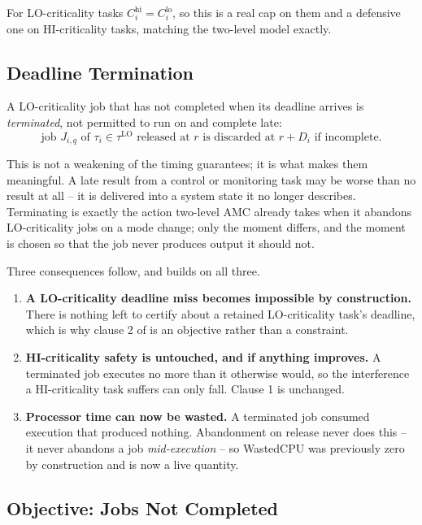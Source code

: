 For LO-criticality tasks $C_i^{\mathrm{hi}} = C_i^{\mathrm{lo}}$, so this is a
real cap on them and a defensive one on HI-criticality tasks, matching the
two-level model exactly.

\subsection{Deadline Termination}
\label{sec:termination}

A LO-criticality job that has not completed when its deadline arrives is
\emph{terminated}, not permitted to run on and complete late:
\[
\text{job } J_{i,q} \text{ of } \tau_i \in \tau^{\mathrm{LO}}
\text{ released at } r \text{ is discarded at } r + D_i \text{ if incomplete.}
\]

This is not a weakening of the timing guarantees; it is what makes them
meaningful. A late result from a control or monitoring task may be worse than
no result at all -- it is delivered into a system state it no longer describes.
Terminating is exactly the action two-level AMC already takes when it abandons
LO-criticality jobs on a mode change; only the moment differs, and the moment
is chosen so that the job never produces output it should not.

Three consequences follow, and  builds on all three.
\begin{enumerate}
\item \textbf{A LO-criticality deadline miss becomes impossible by
  construction.} There is nothing left to certify about a retained
  LO-criticality task's deadline, which is why clause 2 of
   is an objective rather than a constraint.
\item \textbf{HI-criticality safety is untouched, and if anything improves.} A
  terminated job executes no more than it otherwise would, so the interference
  a HI-criticality task suffers can only fall. Clause 1 is unchanged.
\item \textbf{Processor time can now be wasted.} A terminated job consumed
  execution that produced nothing. Abandonment on release never does this --
  it never abandons a job \emph{mid-execution} -- so WastedCPU was previously
  zero by construction and is now a live quantity.
\end{enumerate}

\subsection{Objective: Jobs Not Completed}
\label{sec:objective}

